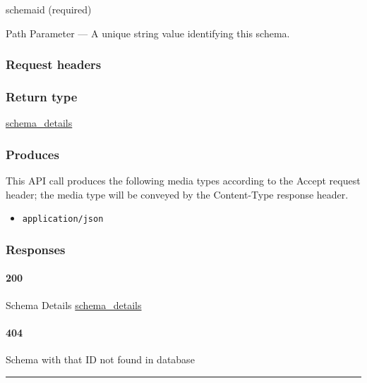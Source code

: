 schemaid (required)

{Path Parameter} --- A unique string value identifying this schema.

\hypertarget{request-headers-98}{%
\subsubsection{Request headers}\label{request-headers-98}}

\hypertarget{return-type-135}{%
\subsubsection{Return type}\label{return-type-135}}

\protect\hyperlink{schema_details}{schema\_details}

\hypertarget{produces-172}{%
\subsubsection{Produces}\label{produces-172}}

This API call produces the following media types according to the
{Accept} request header; the media type will be conveyed by the
{Content-Type} response header.

\begin{itemize}
\tightlist
\item
  \texttt{application/json}
\end{itemize}

\hypertarget{responses-178}{%
\subsubsection{Responses}\label{responses-178}}

\hypertarget{section-573}{%
\paragraph{200}\label{section-573}}

Schema Details \protect\hyperlink{schema_details}{schema\_details}

\hypertarget{section-574}{%
\paragraph{404}\label{section-574}}

Schema with that ID not found in database \protect\hyperlink{}{}

\begin{center}\rule{0.5\linewidth}{\linethickness}\end{center}

